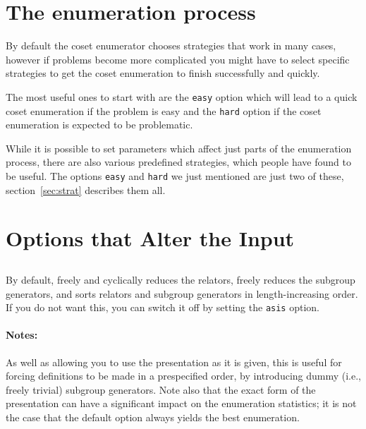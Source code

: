 \section{The enumeration process}
\label{sec:process}

By default the {\ace} coset enumerator chooses strategies that work in many 
cases, however if problems become more complicated you might have to select
specific strategies to get the coset enumeration to finish successfully and
quickly.

The most useful ones to start with are the {\tt easy} option which will lead to a
quick coset enumeration if the problem is easy and the {\tt hard} option if the
coset enumeration is expected to be problematic.

While it is possible to set parameters which affect just parts of the
enumeration process, there are also various predefined strategies, which
people have found to be useful. The options {\tt easy} and {\tt hard} we just
mentioned are just two of these, section~\ref{sec:strat} describes
them all.

\section{Options that Alter the {\ace} Input}

\subsection{}
\label{cmd:asis}
By default, {\ace} freely and cyclically reduces the relators, freely
  reduces the subgroup generators, and sorts relators and subgroup generators
  in length-increasing order.
If you do not want this, you can switch it off by setting the {\tt asis} option.

\paragraph{Notes:}
As well as allowing you to use the presentation as it is given, this is
useful for forcing definitions to be made in a prespecified order, by
introducing dummy (i.e., freely trivial) subgroup generators.  Note also
that the exact form of the presentation can have a significant impact on the
enumeration statistics; it is not the case that the default option always
yields the best enumeration.

